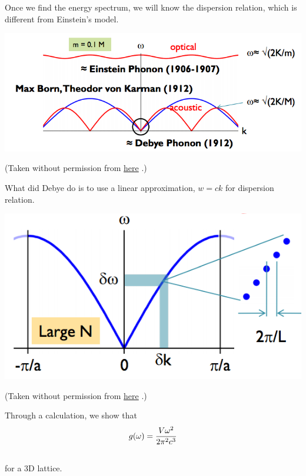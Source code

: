 \documentclass[letterpaper,10pt,english]{sphinxmanual}
\begin{document}
Once we find the energy spectrum, we will know the dispersion relation, which is different from Einstein's model.

{\hfill\includegraphics{DebyeModelkSpace.png}\hfill}

(Taken without permission from \href{http://griffin.ucsc.edu/teaching/08Q1-155/download/Lecture\%2006\%20-\%20Phonon\%20Dynamics.pdf}{here} .)

What did Debye do is to use a linear approximation, $w= c k$ for dispersion relation.

{\hfill\includegraphics{DebyeModelApprox.png}\hfill}

(Taken without permission from \href{http://griffin.ucsc.edu/teaching/08Q1-155/download/Lecture\%2006\%20-\%20Phonon\%20Dynamics.pdf}{here} .)

Through a calculation, we show that
\begin{gather}
\begin{split}g(\omega) = \frac{V \omega^2}{2\pi^2 c^3}\end{split}\notag\\\begin{split}\end{split}\notag
\end{gather}
for a 3D lattice.
\end{document}
